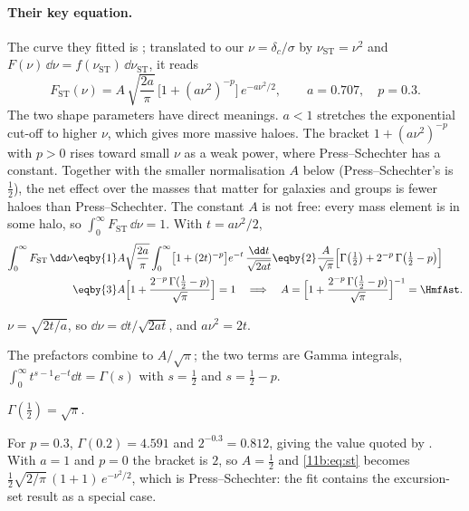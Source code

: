 \paragraph{Their key equation.}
The curve they fitted is ; translated to our
$\nu=\delta_c/\sigma$ by $\nu_{\mathrm{ST}}=\nu^2$ and
$F(\nu)\,\dd\nu=f(\nu_{\mathrm{ST}})\,\dd\nu_{\mathrm{ST}}$, it reads
\begin{equation}
  F_{\mathrm{ST}}(\nu)=A\,\sqrt{\frac{2a}{\pi}}\,
  \bigl[1+(a\nu^2)^{-p}\bigr]\,e^{-a\nu^2/2},
  \qquad a=0.707,\quad p=0.3 .
  \label{11b:eq:st}
\end{equation}
The two shape parameters have direct meanings. $a<1$ stretches the exponential
cut-off to higher $\nu$, which gives more massive haloes. The bracket
$1+(a\nu^2)^{-p}$ with $p>0$ rises toward small $\nu$ as a weak power, where
Press--Schechter has a constant. Together with the smaller normalisation $A$ below
(Press--Schechter's is $\tfrac12$), the net effect over the masses that matter
for galaxies and groups is fewer haloes than Press--Schechter. The constant $A$ is not free: every mass element is in some
halo, so $\int_0^\infty F_{\mathrm{ST}}\,\dd\nu=1$. With $t=a\nu^2/2$,
\begin{align}
  \int_0^\infty F_{\mathrm{ST}}\,\dd\nu
  &\eqby{1}A\sqrt{\frac{2a}{\pi}}\int_0^\infty\bigl[1+(2t)^{-p}\bigr]
     e^{-t}\,\frac{\dd t}{\sqrt{2at}}
   \eqby{2}\frac{A}{\sqrt\pi}\Bigl[\Gamma\bigl(\tfrac12\bigr)
     +2^{-p}\,\Gamma\bigl(\tfrac12-p\bigr)\Bigr]\nonumber\\
  &\eqby{3}A\Bigl[1+\frac{2^{-p}\,\Gamma(\frac12-p)}{\sqrt\pi}\Bigr]=1
  \quad\Longrightarrow\quad
  A=\Bigl[1+\frac{2^{-p}\,\Gamma(\frac12-p)}{\sqrt\pi}\Bigr]^{-1}=\HmfAst .
  \label{11b:eq:st-norm}
\end{align}
\begin{explain}
  \item $\nu=\sqrt{2t/a}$, so $\dd\nu=\dd t/\sqrt{2at}$, and $a\nu^2=2t$.
  \item The prefactors combine to $A/\sqrt\pi$; the two terms are Gamma
        integrals, $\int_0^\infty t^{s-1}e^{-t}\dd t=\Gamma(s)$ with $s=\frac12$
        and $s=\frac12-p$.
  \item $\Gamma(\frac12)=\sqrt\pi$.
\end{explain}
For $p=0.3$, $\Gamma(0.2)=4.591$ and $2^{-0.3}=0.812$, giving the value quoted by
. With $a=1$ and $p=0$ the bracket is $2$, so
$A=\frac12$ and \eqref{11b:eq:st} becomes $\frac12\sqrt{2/\pi}\,(1+1)\,e^{-\nu^2/2}$,
which is Press--Schechter: the fit contains the excursion-set result as a special
case.

